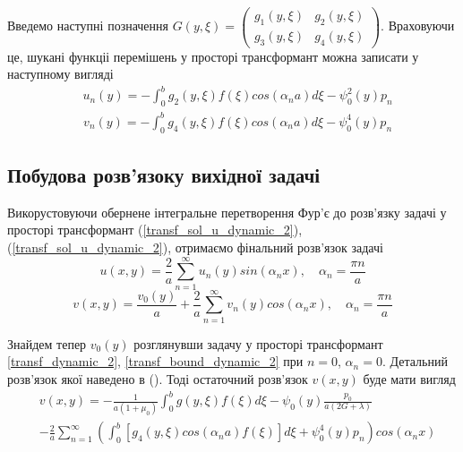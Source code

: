 Введемо наступні позначення $G(y, \xi) = \begin{pmatrix}
    g_1(y,\xi) & g_2(y,\xi) \\
    g_3(y,\xi) & g_4(y,\xi)
\end{pmatrix}$. Враховуючи це, шукані функціі перемішень у просторі трансформант можна записати у наступному вигляді
\begin{align}\label{transf_sol_u_dynamic_2}
    &u_n(y) = -\int_0^b g_2(y, \xi)f(\xi) cos(\alpha_n a) d\xi - \psi_0^2(y) p_n
\end{align}
\begin{align}\label{transf_sol_v_dynamic_2}
    &v_n(y) = -\int_0^b g_4(y, \xi)f(\xi) cos(\alpha_n a) d\xi - \psi_0^4(y) p_n
\end{align}

\subsection{Побудова розв'язоку вихідної задачі}
Викорустовуючи обернене інтегральне перетворення Фур'є до розв'язку задачі у просторі трансформант
(\ref{transf_sol_u_dynamic_2}), (\ref{transf_sol_u_dynamic_2}), отримаємо фінальний розв'язок задачі
\begin{equation}
    u(x,y) = \frac{2}{a} \sum_{n=1}^{\infty} u_n(y) sin(\alpha_n x), \quad \alpha_n = \frac{\pi n}{a}
\end{equation}
\begin{equation}
    v(x,y) = \frac{v_0(y)}{a} + \frac{2}{a} \sum_{n=1}^{\infty} v_n(y) cos(\alpha_n x), \quad \alpha_n = \frac{\pi n}{a}
\end{equation}

Знайдем тепер $v_0(y)$ розглянувши задачу у просторі трансформант \eqref{transf_dynamic_2}, \eqref{transf_bound_dynamic_2} при $n=0$, $\alpha_n = 0$.
Детальний розв'язок якої наведено в (). Тоді остаточний розв'язок $v(x,y)$ буде мати вигляд
\begin{align}
    &v(x,y) = -\frac{1}{a(1+\mu_0)} \int_{0}^{b}g(y,\xi) f(\xi) d\xi - \psi_0(y) \frac{p_0}{a(2G + \lambda)} \nonumber \\
    &- \frac{2}{a} \sum_{n=1}^{\infty} \left( \int_0^b \left[g_4(y, \xi) cos(\alpha_n a) f(\xi) \right]d\xi + \psi_0^4(y) p_n  \right) cos(\alpha_n x)
\end{align}

